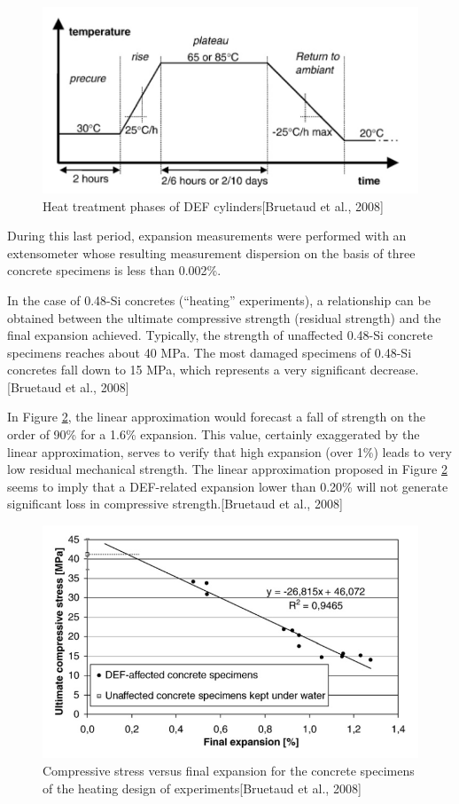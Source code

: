 \begin{figure}[h!]
  \centering
  \includegraphics[width=0.8\linewidth]{Reference/Bruetaud2.png}
  \caption{Heat treatment phases of DEF cylinders[Bruetaud et al., 2008]}
  \label{Bruetaud heat}
\end{figure}

During this last period, expansion measurements were performed with an extensometer whose resulting measurement dispersion on the basis of three concrete specimens is less than 0.002\%.

In the case of 0.48-Si concretes (“heating” experiments), a relationship can be obtained between the ultimate compressive strength (residual strength) and the final expansion achieved. Typically, the strength of unaffected 0.48-Si concrete specimens reaches about 40 MPa. The most damaged specimens of 0.48-Si concretes fall down to 15 MPa, which represents a very significant decrease.[Bruetaud et al., 2008]

In Figure \ref{Bruetaud CS}, the linear approximation would forecast a fall of strength on the order of 90\% for a 1.6\% expansion. This value, certainly exaggerated by the linear approximation, serves to verify that high expansion (over 1\%) leads to very low residual mechanical strength. The linear approximation proposed in Figure \ref{Bruetaud CS} seems to imply that a DEF-related expansion lower
than 0.20\% will not generate significant loss in compressive strength.[Bruetaud et al., 2008]

\begin{figure}[h!]
  \centering
  \includegraphics[width=0.8\linewidth]{Reference/Bruetaud3.png}
  \caption{Compressive stress versus final expansion for the concrete specimens of the
heating design of experiments[Bruetaud et al., 2008]}
  \label{Bruetaud CS}
\end{figure}

